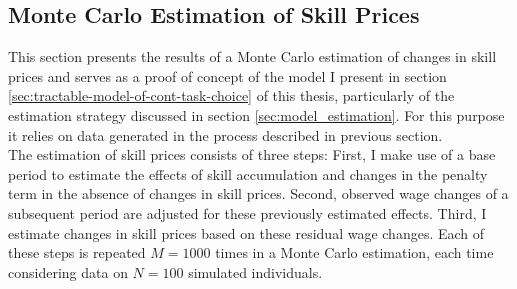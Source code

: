 \documentclass[../main.tex]{subfiles}
\begin{document}
\subsection{Monte Carlo Estimation of Skill Prices} \label{sec:MC_estimation}
This section presents the results of a Monte Carlo estimation of changes in skill prices and serves as a proof of concept of the model I present in section \ref{sec:tractable-model-of-cont-task-choice} of this thesis, particularly of the estimation strategy discussed in section \ref{sec:model_estimation}. For this purpose it relies on data generated in the process described in previous section.
\\
The estimation of skill prices consists of three steps: First, I make use of a base period to estimate the effects of skill accumulation and changes in the penalty term in the absence of changes in skill prices. Second, observed wage changes of a subsequent period are adjusted for these previously estimated effects. Third, I estimate changes in skill prices based on these residual wage changes. Each of these steps is repeated $M=1000$ times in a Monte Carlo estimation, each time considering data on $N=100$ simulated individuals.
\\
\end{document}
